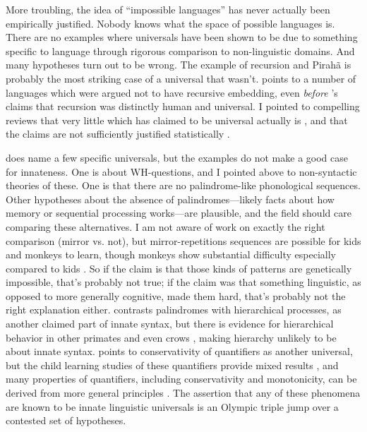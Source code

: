 \documentclass[output=paper,colorlinks,citecolor=brown
]{langscibook}
\begin{document}

More troubling, the idea of ``impossible languages'' has never actually been empirically justified. Nobody knows what the space of possible languages is. There are no examples where universals have been shown to be due to something specific to language through rigorous comparison to non-linguistic domains. And many hypotheses turn out to be wrong. The example of recursion and Pirah\~{a} is probably the most striking case of a universal that wasn't. \cite{pullum2023dan} points to a number of languages which were argued not to have recursive embedding, even \emph{before} \cite{hauser2002faculty}'s claims that recursion was distinctly human and universal. I pointed to compelling reviews that very little which has claimed to be universal actually is \citep{evans2009myth}, and that the claims are not sufficiently justified statistically \citep{piantadosi2014quantitative}. 

\cite{katzir2023large} does name a few specific universals, but the examples do not make a good case for innateness. One is about WH-questions, and I pointed above to non-syntactic theories of these. One is that there are no palindrome-like phonological sequences. Other hypotheses about the absence of palindromes---likely facts about how memory or sequential processing works---are plausible, and the field should care comparing these alternatives. I am not aware of work on exactly the right comparison (mirror vs. not), but mirror-repetitions sequences are possible for kids and monkeys to learn, though monkeys show substantial difficulty especially compared to kids \citep{jiang2018production}. So if the claim is that those kinds of patterns are genetically impossible, that's probably not true; if the claim was that something linguistic, as opposed to more generally cognitive, made them hard, that's probably not the right explanation either. \cite{katzir2023large} contrasts palindromes with hierarchical processes, as another claimed part of innate syntax, but there is evidence for hierarchical behavior in other primates \citep{ferrigno2020recursive,voloh2023hierarchical} and even crows \citep{liao2022recursive}, making hierarchy unlikely to be about innate syntax. \cite{katzir2023large} points to conservativity of quantifiers as another universal, but the child learning studies of these quantifiers provide mixed results \citep{spenader2019conservative}, and many properties of quantifiers, including conservativity and monotonicity, can be derived from more general principles \citep{steinert2019learnability,carcassi2021monotone,van2021quantifiers,steinert2021quantifiers}.
The assertion that any of these phenomena are known to be innate linguistic universals is an Olympic triple jump over a contested set of hypotheses. 
\end{document}
